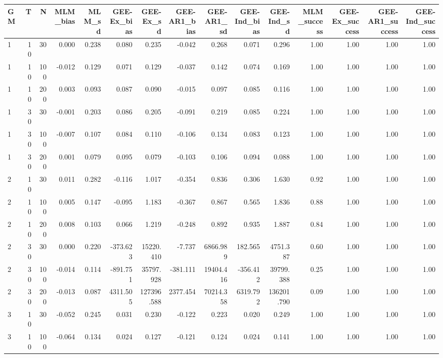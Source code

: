 \documentclass[
  12pt,
  a4paper,
]{article}
\begin{document}
\begin{table}[H]
\centering
\begin{tabular}{lrrrrrrrrrrrrrr}
  \hline
GM & T & N & MLM\_bias & MLM\_sd & GEE-Ex\_bias & GEE-Ex\_sd & GEE-AR1\_bias & GEE-AR1\_sd & GEE-Ind\_bias & GEE-Ind\_sd & MLM\_success & GEE-Ex\_success & GEE-AR1\_success & GEE-Ind\_success \\ 
  \hline
1 & 10 & 30 & 0.000 & 0.238 & 0.080 & 0.235 & -0.042 & 0.268 & 0.071 & 0.296 & 1.00 & 1.00 & 1.00 & 1.00 \\ 
  1 & 10 & 100 & -0.012 & 0.129 & 0.071 & 0.129 & -0.037 & 0.142 & 0.074 & 0.169 & 1.00 & 1.00 & 1.00 & 1.00 \\ 
  1 & 10 & 200 & 0.003 & 0.093 & 0.087 & 0.090 & -0.015 & 0.097 & 0.085 & 0.116 & 1.00 & 1.00 & 1.00 & 1.00 \\ 
  1 & 30 & 30 & -0.001 & 0.203 & 0.086 & 0.205 & -0.091 & 0.219 & 0.085 & 0.224 & 1.00 & 1.00 & 1.00 & 1.00 \\ 
  1 & 30 & 100 & -0.007 & 0.107 & 0.084 & 0.110 & -0.106 & 0.134 & 0.083 & 0.123 & 1.00 & 1.00 & 1.00 & 1.00 \\ 
  1 & 30 & 200 & 0.001 & 0.079 & 0.095 & 0.079 & -0.103 & 0.106 & 0.094 & 0.088 & 1.00 & 1.00 & 1.00 & 1.00 \\ 
  \hline
  2 & 10 & 30 & 0.011 & 0.282 & -0.116 & 1.017 & -0.354 & 0.836 & 0.306 & 1.630 & 0.92 & 1.00 & 1.00 & 1.00 \\ 
  2 & 10 & 100 & 0.005 & 0.147 & -0.095 & 1.183 & -0.367 & 0.867 & 0.565 & 1.836 & 0.88 & 1.00 & 1.00 & 1.00 \\ 
  2 & 10 & 200 & 0.008 & 0.103 & 0.066 & 1.219 & -0.248 & 0.892 & 0.935 & 1.887 & 0.84 & 1.00 & 1.00 & 1.00 \\ 
  2 & 30 & 30 & 0.000 & 0.220 & -373.623 & 15220.410 & -7.737 & 6866.989 & 182.565 & 4751.387 & 0.60 & 1.00 & 1.00 & 1.00 \\ 
  2 & 30 & 100 & -0.014 & 0.114 & -891.751 & 35797.928 & -381.111 & 19404.416 & -356.412 & 39799.388 & 0.25 & 1.00 & 1.00 & 1.00 \\ 
  2 & 30 & 200 & -0.013 & 0.087 & 4311.505 & 127396.588 & 2377.454 & 70214.358 & 6319.792 & 136201.790 & 0.09 & 1.00 & 1.00 & 1.00 \\ 
  \hline
  3 & 10 & 30 & -0.052 & 0.245 & 0.031 & 0.230 & -0.122 & 0.223 & 0.020 & 0.249 & 1.00 & 1.00 & 1.00 & 1.00 \\ 
  3 & 10 & 100 & -0.064 & 0.134 & 0.024 & 0.127 & -0.121 & 0.124 & 0.024 & 0.141 & 1.00 & 1.00 & 1.00 & 1.00 \\ 

\end{tabular}
\end{table}
\end{document}
